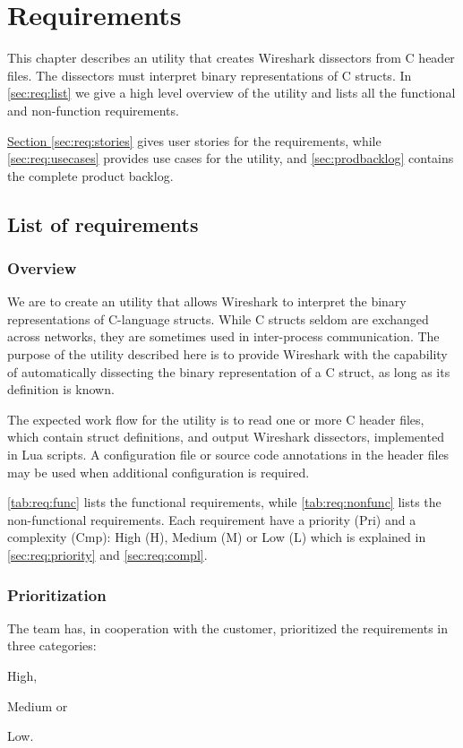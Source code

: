 \chapter{Requirements}
\label{chap:req:requirements}
This chapter describes an utility that creates Wireshark dissectors from C
header files. The dissectors must interpret binary representations of C
structs. In \autoref{sec:req:list} we give a high level overview of the
utility and lists all the functional and non-function requirements.

\hyperref[sec:req:stories]{Section \ref*{sec:req:stories}} gives user stories
for the requirements, while \autoref{sec:req:usecases} provides use cases for
the utility, and \autoref{sec:prodbacklog} contains the complete product
backlog.

\section{List of requirements}
\label{sec:req:list}

\subsection{Overview}
We are to create an utility that allows Wireshark to interpret the binary
representations of C-language structs. While C structs seldom are exchanged
across networks, they are sometimes used in inter-process communication. The
purpose of the utility described here is to provide Wireshark with the
capability of automatically dissecting the binary representation of a C struct,
as long as its definition is known.

The expected work flow for the utility is to read one or more C header files,
which contain struct definitions, and output Wireshark dissectors, implemented
in Lua scripts. A configuration file or source code annotations in the header
files may be used when additional configuration is required.

\autoref{tab:req:func} lists the functional requirements, while
\autoref{tab:req:nonfunc} lists the non-functional requirements. Each
requirement have a priority (Pri) and a complexity (Cmp): High (H), 
Medium (M) or Low (L) which is explained in \autoref{sec:req:priority} and
\autoref{sec:req:compl}.

\subsection{Prioritization}
\label{sec:req:priority}
The team has, in cooperation with the customer, prioritized the requirements
in three categories:
\begin{inparaenum}
	\item High,
	\item Medium or
	\item Low.
\end{inparaenum} 

